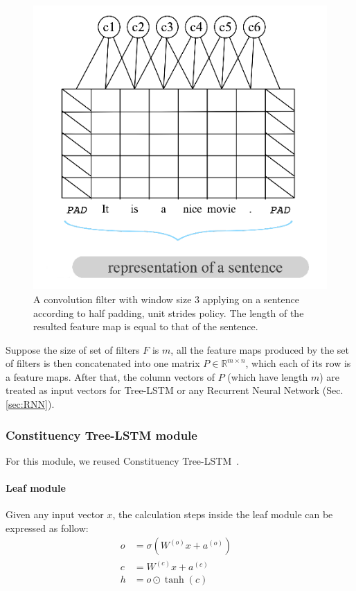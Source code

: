 \begin{figure}[H]
    \centering
\includegraphics[scale=0.45]{figure/half-padding}
    \caption[Half padding, unit strides policy]{A convolution filter with window size 3 applying on a sentence according to half padding, unit strides policy.
    The length of the resulted feature map is equal to that of the sentence.}
    \label{fig:half-padding}
\end{figure}

Suppose the size of set of filters \(F\) is \(m\), all the feature maps produced by the set of filters is then concatenated into one matrix \(P \in \mathbb{R}^{m \times n}\), which each of its row is a feature maps.
After that, the column vectors of \(P\) (which have length \(m\)) are treated as input vectors for Tree-LSTM or any Recurrent Neural Network (Sec.\ref{sec:RNN}).

\subsubsection{Constituency Tree-LSTM module}
For this module, we reused Constituency Tree-LSTM~\cite{treeLSTM}.
\paragraph{Leaf module}
Given any input vector \({x}\), the calculation steps inside the leaf module can be expressed as follow:
\begin{align}
    o &= \sigma{\left( W^{(o)} x + a^{\left(o\right)}\right)} & \\
       c &= W^{(c)} x + a^{(c)} & \\
    h &= o \odot \tanh{\left(c\right)} &
\end{align}


